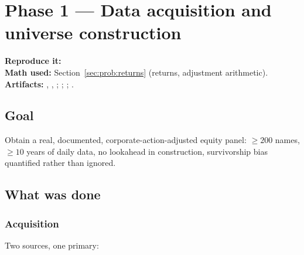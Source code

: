 \section{Phase 1 --- Data acquisition and universe construction}
\label{ch:phase1}

\textbf{Reproduce it:} \\
\textbf{Math used:} Section~\ref{sec:prob:returns} (returns, adjustment arithmetic).\\
\textbf{Artifacts:} , ,
; ;
;
.

\subsection{Goal}

Obtain a real, documented, corporate-action-adjusted equity panel: $\ge200$ names,
$\ge10$ years of daily data, no lookahead in construction, survivorship bias quantified
rather than ignored.

\subsection{What was done}
\label{sec:phase1:universe}

\subsubsection{Acquisition}

Two sources, one primary:

